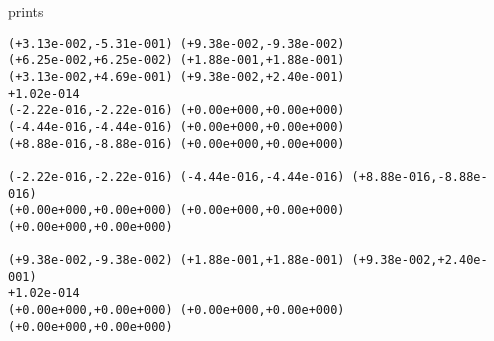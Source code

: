 prints
\begin{Verbatim}
(+3.13e-002,-5.31e-001) (+9.38e-002,-9.38e-002)
(+6.25e-002,+6.25e-002) (+1.88e-001,+1.88e-001)
(+3.13e-002,+4.69e-001) (+9.38e-002,+2.40e-001)
+1.02e-014
(-2.22e-016,-2.22e-016) (+0.00e+000,+0.00e+000)
(-4.44e-016,-4.44e-016) (+0.00e+000,+0.00e+000)
(+8.88e-016,-8.88e-016) (+0.00e+000,+0.00e+000)

(-2.22e-016,-2.22e-016) (-4.44e-016,-4.44e-016) (+8.88e-016,-8.88e-016)
(+0.00e+000,+0.00e+000) (+0.00e+000,+0.00e+000) (+0.00e+000,+0.00e+000)

(+9.38e-002,-9.38e-002) (+1.88e-001,+1.88e-001) (+9.38e-002,+2.40e-001)
+1.02e-014
(+0.00e+000,+0.00e+000) (+0.00e+000,+0.00e+000) (+0.00e+000,+0.00e+000)
\end{Verbatim}
\newpage




